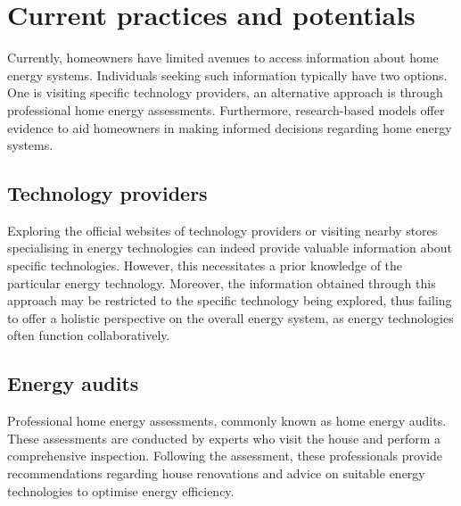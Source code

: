 \section{Current practices and potentials}

Currently, homeowners have limited avenues to access information about home energy systems. 
Individuals seeking such information typically have two options. 
One is visiting specific technology providers,
an alternative approach is through professional home energy assessments. 
Furthermore, research-based models offer evidence to aid homeowners in making informed decisions regarding home energy systems.


\subsection{Technology providers}

Exploring the official websites of technology providers or visiting nearby stores specialising in energy technologies can indeed provide valuable information about specific technologies. 
However, this necessitates a prior knowledge of the particular energy technology.
Moreover, the information obtained through this approach may be restricted to the specific technology being explored, 
thus failing to offer a holistic perspective on the overall energy system, as energy technologies often function collaboratively.


\subsection{Energy audits}

Professional home energy assessments, commonly known as home energy audits.
These assessments are conducted by experts who visit the house and perform a comprehensive inspection. 
Following the assessment, these professionals provide recommendations regarding house renovations and advice on suitable energy technologies to optimise energy efficiency. 

